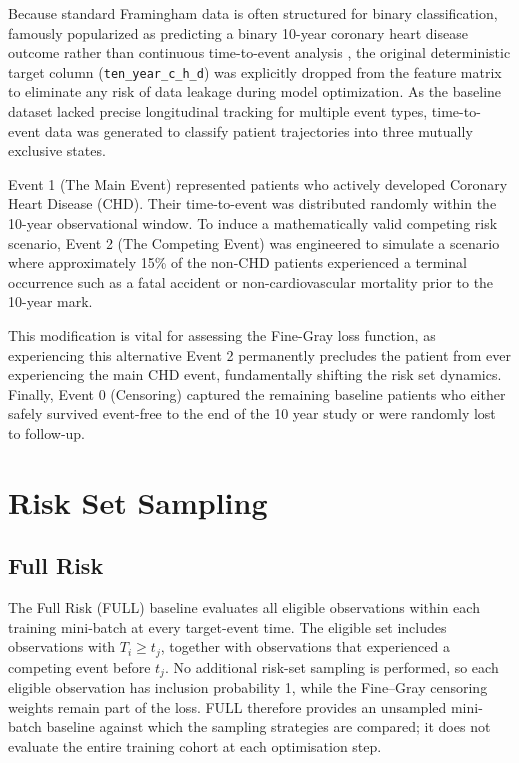 \documentclass[a4paper,twoside,12pt]{report}
\begin{document}
Because standard Framingham data is often structured for binary classification, famously popularized as predicting a binary 10-year coronary heart disease outcome rather than continuous time-to-event analysis \cite{wilson1998prediction}, the original deterministic target column (\texttt{ten\_year\_c\_h\_d}) was explicitly dropped from the feature matrix to eliminate any risk of data leakage during model optimization. As the baseline dataset lacked precise longitudinal tracking for multiple event types, time-to-event data was  generated to classify patient trajectories into three mutually exclusive states.

Event 1 (The Main Event) represented patients who actively developed Coronary Heart Disease (CHD). Their time-to-event was distributed randomly within the 10-year observational window. To induce a mathematically valid competing risk scenario, Event 2 (The Competing Event) was engineered to simulate a scenario where approximately 15\% of the non-CHD patients experienced a terminal occurrence such as a fatal accident or non-cardiovascular mortality prior to the 10-year mark. 

This  modification is vital for assessing the Fine-Gray loss function, as experiencing this alternative Event 2 permanently precludes the patient from ever experiencing the main CHD event, fundamentally shifting the risk set dynamics. Finally, Event 0 (Censoring) captured the remaining baseline patients who either safely survived event-free to the end of the 10 year study or were randomly lost to follow-up.

\section{Risk Set Sampling}

\subsection{Full Risk}
The Full Risk (FULL) baseline evaluates all eligible observations within each training mini-batch at every target-event time. The eligible set includes observations with $T_i \ge t_j$, together with observations that experienced a competing event before $t_j$. No additional risk-set sampling is performed, so each eligible observation has inclusion probability 1, while the Fine--Gray censoring weights remain part of the loss. FULL therefore provides an unsampled mini-batch baseline against which the sampling strategies are compared; it does not evaluate the entire training cohort at each optimisation step.
\end{document}
